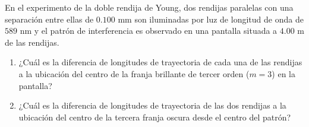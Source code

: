 \item En el experimento de la doble rendija de Young, dos rendijas paralelas con una separación entre ellas de $0.100\text{ mm}$ son iluminadas por luz de longitud de onda de $589\text{ nm}$ y el patrón de interferencia es observado en una pantalla situada a $4.00\text{ m}$ de las rendijas.
\begin{enumerate}
    \item ¿Cuál es la diferencia de longitudes de trayectoria de cada una de las rendijas a la ubicación del centro de la franja brillante de tercer orden ($m = 3$) en la pantalla?
    \item ¿Cuál es la diferencia de longitudes de trayectoria de las dos rendijas a la ubicación del centro de la tercera franja oscura desde el centro del patrón?
\end{enumerate}